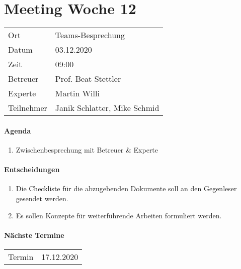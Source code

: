 \section*{Meeting Woche 12}

\begin{table}[h!]
	\begin{tabularx}{\textwidth}{l X }
		Ort & Teams-Besprechung \\
		Datum & 03.12.2020 \\
		Zeit & 09:00 \\
        Betreuer & Prof. Beat Stettler \\
        Experte & Martin Willi \\        
		Teilnehmer & Janik Schlatter, Mike Schmid \\
	\end{tabularx}
\end{table}

\paragraph{Agenda}
\begin{enumerate}
	\item Zwischenbesprechung mit Betreuer \& Experte
\end{enumerate}

\paragraph{Entscheidungen}
\begin{enumerate}
	\item Die Checkliste für die abzugebenden Dokumente soll an den 
	Gegenleser gesendet werden.
    \item Es sollen Konzepte für weiterführende Arbeiten formuliert werden.
\end{enumerate}

\paragraph{Nächste Termine} \hfill
\begin{table}[h!]
	\begin{tabularx}{\textwidth}{l X }
		Termin & 17.12.2020 \\
	\end{tabularx}
\end{table}

\clearpage